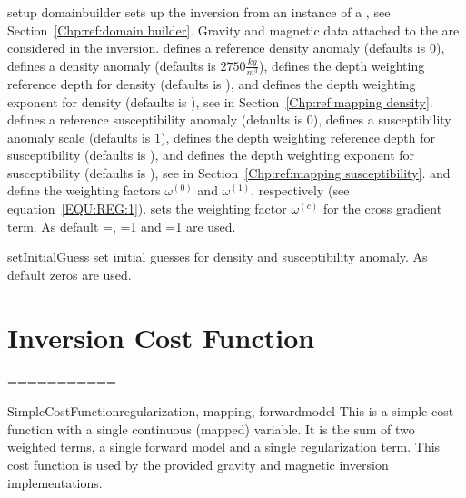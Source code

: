 \begin{methoddesc}[JointGravityMagneticInversion]{setup}{
domainbuilder
}
sets up the inversion from an instance  of a , see Section~\ref{Chp:ref:domain builder}.
Gravity and magnetic data attached to the  are considered in the inversion.
 defines a reference density anomaly (defaults is 0), 
 defines a density anomaly (defaults is $2750 \frac{kg}{m^3}$),
 defines the depth weighting reference depth for density (defaults is \None), and
 defines the depth weighting exponent for density (defaults is \None),
see  in Section~\ref{Chp:ref:mapping density}.
 defines a reference susceptibility anomaly (defaults is 0), 
 defines a susceptibility anomaly scale (defaults is $1$),
 defines the depth weighting reference depth for susceptibility (defaults is \None), and
 defines the depth weighting exponent for susceptibility (defaults is \None),
see  in Section~\ref{Chp:ref:mapping susceptibility}.
 and  define the weighting factors
$\omega^{(0)}$ and
$\omega^{(1)}$, respectively (see equation~\ref{EQU:REG:1}). 
 sets the weighting factor $\omega^{(c)}$ for the cross gradient term. 
As default =\None, =1 and =1 are used.
\end{methoddesc}

\begin{methoddesc}[JointGravityMagneticInversion]{setInitialGuess}{ }
set initial guesses for density and susceptibility anomaly. As default zeros are used.
\end{methoddesc}



\section{Inversion Cost Function}


===========
\begin{classdesc}{SimpleCostFunction}{regularization, mapping, forwardmodel}
    This is a simple cost function with a single continuous (mapped) variable.
    It is the sum of two weighted terms, a single forward model and a single
    regularization term. This cost function is used by the provided gravity
    and magnetic inversion implementations.
\end{classdesc}
